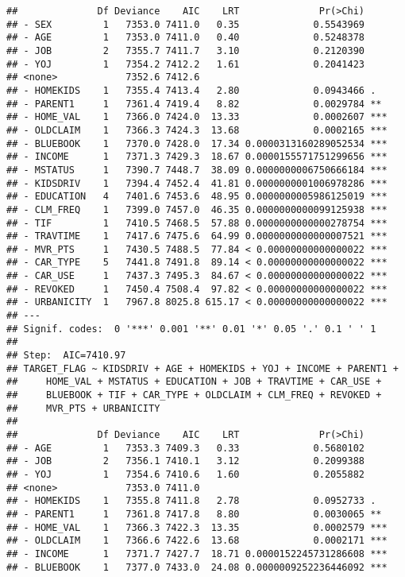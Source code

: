 \documentclass[
]{article}
\begin{document}
\begin{verbatim}
##              Df Deviance    AIC    LRT              Pr(>Chi)    
## - SEX         1   7353.0 7411.0   0.35             0.5543969    
## - AGE         1   7353.0 7411.0   0.40             0.5248378    
## - JOB         2   7355.7 7411.7   3.10             0.2120390    
## - YOJ         1   7354.2 7412.2   1.61             0.2041423    
## <none>            7352.6 7412.6                                 
## - HOMEKIDS    1   7355.4 7413.4   2.80             0.0943466 .  
## - PARENT1     1   7361.4 7419.4   8.82             0.0029784 ** 
## - HOME_VAL    1   7366.0 7424.0  13.33             0.0002607 ***
## - OLDCLAIM    1   7366.3 7424.3  13.68             0.0002165 ***
## - BLUEBOOK    1   7370.0 7428.0  17.34 0.0000313160289052534 ***
## - INCOME      1   7371.3 7429.3  18.67 0.0000155571751299656 ***
## - MSTATUS     1   7390.7 7448.7  38.09 0.0000000006750666184 ***
## - KIDSDRIV    1   7394.4 7452.4  41.81 0.0000000001006978286 ***
## - EDUCATION   4   7401.6 7453.6  48.95 0.0000000005986125019 ***
## - CLM_FREQ    1   7399.0 7457.0  46.35 0.0000000000099125938 ***
## - TIF         1   7410.5 7468.5  57.88 0.0000000000000278754 ***
## - TRAVTIME    1   7417.6 7475.6  64.99 0.0000000000000007521 ***
## - MVR_PTS     1   7430.5 7488.5  77.84 < 0.00000000000000022 ***
## - CAR_TYPE    5   7441.8 7491.8  89.14 < 0.00000000000000022 ***
## - CAR_USE     1   7437.3 7495.3  84.67 < 0.00000000000000022 ***
## - REVOKED     1   7450.4 7508.4  97.82 < 0.00000000000000022 ***
## - URBANICITY  1   7967.8 8025.8 615.17 < 0.00000000000000022 ***
## ---
## Signif. codes:  0 '***' 0.001 '**' 0.01 '*' 0.05 '.' 0.1 ' ' 1
## 
## Step:  AIC=7410.97
## TARGET_FLAG ~ KIDSDRIV + AGE + HOMEKIDS + YOJ + INCOME + PARENT1 + 
##     HOME_VAL + MSTATUS + EDUCATION + JOB + TRAVTIME + CAR_USE + 
##     BLUEBOOK + TIF + CAR_TYPE + OLDCLAIM + CLM_FREQ + REVOKED + 
##     MVR_PTS + URBANICITY
## 
##              Df Deviance    AIC    LRT              Pr(>Chi)    
## - AGE         1   7353.3 7409.3   0.33             0.5680102    
## - JOB         2   7356.1 7410.1   3.12             0.2099388    
## - YOJ         1   7354.6 7410.6   1.60             0.2055882    
## <none>            7353.0 7411.0                                 
## - HOMEKIDS    1   7355.8 7411.8   2.78             0.0952733 .  
## - PARENT1     1   7361.8 7417.8   8.80             0.0030065 ** 
## - HOME_VAL    1   7366.3 7422.3  13.35             0.0002579 ***
## - OLDCLAIM    1   7366.6 7422.6  13.68             0.0002171 ***
## - INCOME      1   7371.7 7427.7  18.71 0.0000152245731286608 ***
## - BLUEBOOK    1   7377.0 7433.0  24.08 0.0000009252236446092 ***

\end{verbatim}
\end{document}
